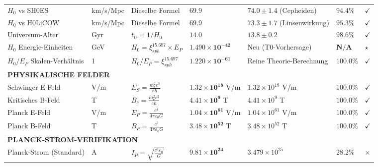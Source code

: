 \documentclass[12pt,a4paper]{article}
\begin{document}
\begin{landscape}
\begin{longtable}{p{5.5cm}p{1.8cm}p{4cm}p{3.5cm}p{3.5cm}p{1.8cm}p{1cm}}
			$H_0$ vs SH0ES & km/s/Mpc & Dieselbe Formel & $\mathbf{69.9}$ & $74.0 \pm 1.4$ (Cepheiden) & $\mathbf{94.4\%}$ & $\checkmark$ \\
			
			$H_0$ vs H0LiCOW & km/s/Mpc & Dieselbe Formel & $\mathbf{69.9}$ & $73.3 \pm 1.7$ (Linsenwirkung) & $\mathbf{95.3\%}$ & $\checkmark$ \\
			
			Universum-Alter & Gyr & $t_U = 1/H_0$ & $\mathbf{14.0}$ & $13.8 \pm 0.2$ & $\mathbf{98.6\%}$ & $\checkmark$ \\
			
			$H_0$ Energie-Einheiten & GeV & $H_0 = \xi_{sph}^{15.697} \times E_P$ & $\mathbf{1.490 \times 10^{-42}}$ & Neu (T0-Vorhersage) & $\mathbf{N/A}$ & $\star$ \\
			
			$H_0/E_P$ Skalen-Verhältnis & 1 & $H_0/E_P = \xi_{sph}^{15.697}$ & $\mathbf{1.220 \times 10^{-61}}$ & Reine Theorie-Berechnung & $\mathbf{100.0\%}$ & $\checkmark$ \\
			
			\multicolumn{7}{l}{\textbf{PHYSIKALISCHE FELDER}} \\
			\midrule
			Schwinger E-Feld & V/m & $E_S = \frac{m_e^2 c^3}{e\hbar}$ & $\mathbf{1.32 \times 10^{18}}$ V/m & $1.32 \times 10^{18}$ V/m & $\mathbf{100.0\%}$ & $\checkmark$ \\
			
			Kritisches B-Feld & T & $B_c = \frac{m_e^2 c^2}{e\hbar}$ & $\mathbf{4.41 \times 10^{9}}$ T & $4.41 \times 10^{9}$ T & $\mathbf{100.0\%}$ & $\checkmark$ \\
			
			Planck E-Feld & V/m & $E_P = \frac{c^4}{4\pi\varepsilon_0 G}$ & $\mathbf{1.04 \times 10^{61}}$ V/m & $1.04 \times 10^{61}$ V/m & $\mathbf{100.0\%}$ & $\checkmark$ \\
			
			Planck B-Feld & T & $B_P = \frac{c^3}{4\pi\varepsilon_0 G}$ & $\mathbf{3.48 \times 10^{52}}$ T & $3.48 \times 10^{52}$ T & $\mathbf{100.0\%}$ & $\checkmark$ \\
			
			\multicolumn{7}{l}{\textbf{PLANCK-STROM-VERIFIKATION}} \\
			\midrule
			Planck-Strom (Standard) & A & $I_P = \sqrt{\frac{c^6\varepsilon_0}{G}}$ & $\mathbf{9.81 \times 10^{24}}$ & $3.479 \times 10^{25}$ & $\mathbf{28.2\%}$ & $\times$ \\
			

\end{longtable}
\end{landscape}
\end{document}
